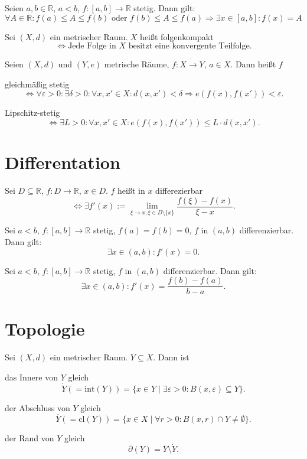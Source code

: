 \documentclass[]{scrartcl}
\newcommand{\R}{\ensuremath{\mathbb{R}}}
\begin{document}
\begin{satz}[Zwischenwertsatz]
Seien $a,b\in\R$, $a<b$, $f\colon \left[a,b\right]\to\R$ stetig. Dann gilt:
\[\forall A\in\R\colon f(a)\leq A\leq f(b)\text{ oder } f(b)\leq A\leq f(a) \Rightarrow \exists x\in\left[a,b\right]\colon f(x)=A\]
\end{satz}

\begin{definition}[Folgenkompakt]
Sei $(X,d)$ ein metrischer Raum. $X$ hei\ss t folgenkompakt
\[\Leftrightarrow\text{Jede Folge in $X$ besitzt eine konvergente Teilfolge.}\]
\end{definition}

\begin{definition}
Seien $(X,d)$ und $(Y,e)$ metrische R\"aume, $f\colon X\to Y$, $a\in X$. Dann hei\ss t $f$

gleichm\"a\ss ig stetig
\[\Leftrightarrow\forall\varepsilon>0\colon \exists\delta>0\colon \forall x,x'\in X\colon d(x,x')<\delta\Rightarrow e(f(x),f(x'))<\varepsilon.\]

Lipschitz-stetig
\[\Leftrightarrow\exists L>0\colon \forall x,x'\in X\colon e(f(x),f(x'))\leq L\cdot d(x,x').\]
\end{definition}

\section*{Differentation}
\begin{definition}[Differenzierbar]
Sei $D\subseteq\R$, $f\colon D\to\R$, $x\in D$. $f$ hei\ss t in $x$ differezierbar
\[\Leftrightarrow\exists f'(x):=\lim\limits_{\xi\to x,\xi\in D\setminus\{x\}}\frac{f(\xi)-f(x)}{\xi-x}.\]
\end{definition}

\begin{satz}
Sei $a<b$, $f\colon \left[a,b\right]\to\R$ stetig, $f(a)=f(b)=0$, $f$ in $(a,b)$ differenzierbar. Dann gilt:
\[\exists x\in(a,b)\colon f'(x)=0.\]
\end{satz}

\begin{satz}[Mittelwertsatz]
Sei $a<b$, $f\colon \left[a,b\right]\to\R$ stetig, $f$ in $(a,b)$ differenzierbar. Dann gilt:
\[\exists x\in(a,b)\colon f'(x)=\frac{f(b)-f(a)}{b-a}.\]
\end{satz}

\section*{Topologie}
\begin{definition}
Sei $(X,d)$ ein metrischer Raum. $Y\subseteq X$. Dann ist

das Innere von $Y$ gleich
\[\dot{Y}(=\text{int}(Y))=\{x\in Y\mid \exists\varepsilon>0\colon B(x,\varepsilon)\subseteq Y\}.\]

der Abschluss von $Y$ gleich
\[\overline{Y}(=\text{cl}(Y))=\{x\in X\mid \forall r>0\colon B(x,r)\cap Y\neq\emptyset\}.\]

der Rand von $Y$ gleich
\[\partial(Y)=\overline{Y}\setminus\dot{Y}.\]
\end{definition}
\end{document}
